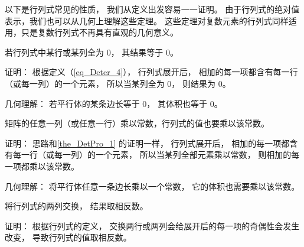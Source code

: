 


以下是行列式常见的性质， 我们从定义出发容易一一证明。 由于行列式的绝对值表示，我们也可以从几何上理解这些定理。 这些定理对复数元素的行列式同样适用，只是复数行列式不再具有直观的几何意义。

\begin{theorem}{ } \label{the_DetPro_1}
若行列式中某行或某列全为 0， 其结果等于 0。
\end{theorem}
证明： 根据定义（\autoref{eq_Deter_4}）， 行列式展开后， 相加的每一项都含有每一行（或每一列）的一个元素， 所以当某列全为 0， 则结果为 0。

几何理解： 若平行体的某条边长等于 0， 其体积也等于 0。

\begin{theorem}{ } \label{the_DetPro_3}
矩阵的任意一列（或任意一行）乘以常数，行列式的值也要乘以该常数。
\end{theorem}
证明： 思路和\autoref{the_DetPro_1} 的证明一样， 行列式展开后， 相加的每一项都含有每一行（或每一列）的一个元素， 所以当某列全部元素乘以常数， 则相加的每一项都乘以该常数。

几何理解： 将平行体任意一条边长乘以一个常数， 它的体积也需要乘以该常数。

\begin{theorem}{ }\label{the_DetPro_6}
将行列式的两列交换， 结果取相反数。
\end{theorem}
证明： 根据行列式的定义， 交换两行或两列会给展开后的每一项的奇偶性会发生改变， 导致行列式的值取相反数。

